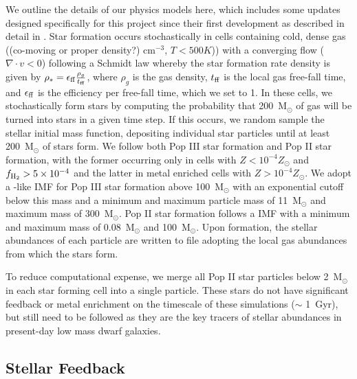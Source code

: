 \documentclass[12pt]{article} %
\begin{document}
We outline the details of our physics models here, which includes some updates designed specifically for this project since their first development as described in detail in \cite{Emerick2019a}. Star formation occurs stochastically in cells containing cold, dense gas ((co-moving or proper density?) cm$^{-3}$, $T < 500 K$)) with a converging flow ($\nabla \cdot v < 0$) following a Schmidt law whereby the star formation rate density is given by $\rho_* = \epsilon_{\rm ff} \frac{\rho_g}{t_{\rm ff}}$, where $\rho_g$ is the gas density, $t_{\rm ff}$ is the local gas free-fall time, and $\epsilon_{\rm ff}$ is the efficiency per free-fall time, which we set to 1. In these cells, we stochastically form stars by computing the probability that 200~M$_{\odot}$ of gas will be turned into stars in a given time step. If this occurs, we random sample the stellar initial mass function, depositing individual star particles until at least 200~M$_{\odot}$ of stars form. We follow both Pop III star formation and Pop II star formation, with the former occurring only in cells with $Z < 10^{-4} Z_{\odot}$ and $f_{\rm H_2} > 5\times 10^{-4}$ and the latter in metal enriched cells with $Z > 10^{-4} Z_{\odot}$. We adopt a \cite{Salpeter1955}-like IMF for Pop III star formation  above 100~M$_{\odot}$ with an exponential cutoff below this mass and a minimum and maximum particle mass of 11~M$_{\odot}$ and maximum mass of 300~M$_{\odot}$. Pop II star formation follows a \cite{Kroupa2001} IMF with a minimum and maximum mass of 0.08~M$_{\odot}$ and 100~M$_{\odot}$. Upon formation, the stellar abundances of each particle are written to file adopting the local gas abundances from which the stars form. 

To reduce computational expense, we merge all Pop II star particles below 2~M$_{\odot}$ in each star forming cell into a single particle. These stars do not have significant feedback or metal enrichment on the timescale of these simulations ($\sim$ 1~Gyr), but still need to be followed as they are the key tracers of stellar abundances in present-day low mass dwarf galaxies. 

\subsection{Stellar Feedback}
\end{document}
